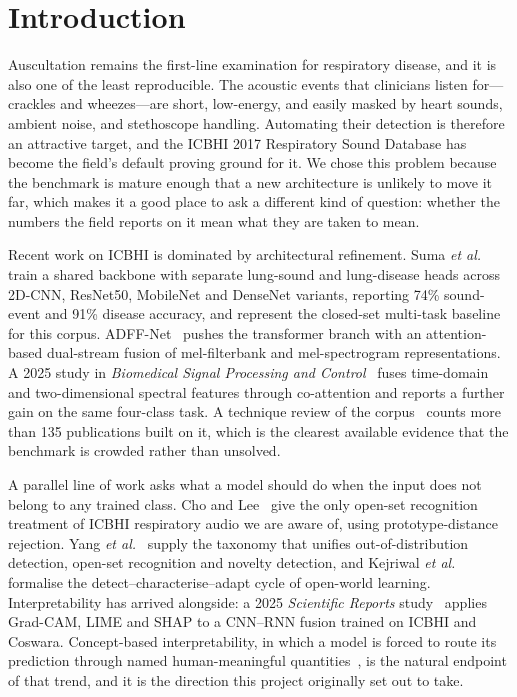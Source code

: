 \documentclass[journal,onecolumn]{IEEEtran}
\begin{document}
\section{Introduction}
\label{sec:intro}

Auscultation remains the first-line examination for respiratory disease, and it is
also one of the least reproducible. The acoustic events that clinicians listen
for---crackles and wheezes---are short, low-energy, and easily masked by heart
sounds, ambient noise, and stethoscope handling. Automating their detection is
therefore an attractive target, and the ICBHI 2017 Respiratory Sound Database has
become the field's default proving ground for it. We chose this problem because the
benchmark is mature enough that a new architecture is unlikely to move it far, which
makes it a good place to ask a different kind of question: whether the numbers the
field reports on it mean what they are taken to mean.

Recent work on ICBHI is dominated by architectural refinement. Suma
\emph{et al.}~\cite{suma2025mtl} train a shared backbone with separate lung-sound and
lung-disease heads across 2D-CNN, ResNet50, MobileNet and DenseNet variants,
reporting 74\% sound-event and 91\% disease accuracy, and represent the closed-set
multi-task baseline for this corpus. ADFF-Net~\cite{adffnet2025} pushes the
transformer branch with an attention-based dual-stream fusion of mel-filterbank and
mel-spectrogram representations. A 2025 study in \emph{Biomedical Signal Processing
and Control}~\cite{bspc2025fusion} fuses time-domain and two-dimensional spectral
features through co-attention and reports a further gain on the same four-class task.
A technique review of the corpus~\cite{electronics2025review} counts more than 135
publications built on it, which is the clearest available evidence that the benchmark
is crowded rather than unsolved.

A parallel line of work asks what a model should do when the input does not belong to
any trained class. Cho and Lee~\cite{cho2025openset} give the only open-set
recognition treatment of ICBHI respiratory audio we are aware of, using
prototype-distance rejection. Yang \emph{et al.}~\cite{yang2024ood} supply the
taxonomy that unifies out-of-distribution detection, open-set recognition and novelty
detection, and Kejriwal \emph{et al.}~\cite{kejriwal2024owl} formalise the
detect--characterise--adapt cycle of open-world learning. Interpretability has
arrived alongside: a 2025 \emph{Scientific Reports} study~\cite{scirep2025cnnrnn}
applies Grad-CAM, LIME and SHAP to a CNN--RNN fusion trained on ICBHI and Coswara.
Concept-based interpretability, in which a model is forced to route its prediction
through named human-meaningful quantities~\cite{koh2020cbm}, is the natural endpoint
of that trend, and it is the direction this project originally set out to take.
\end{document}
